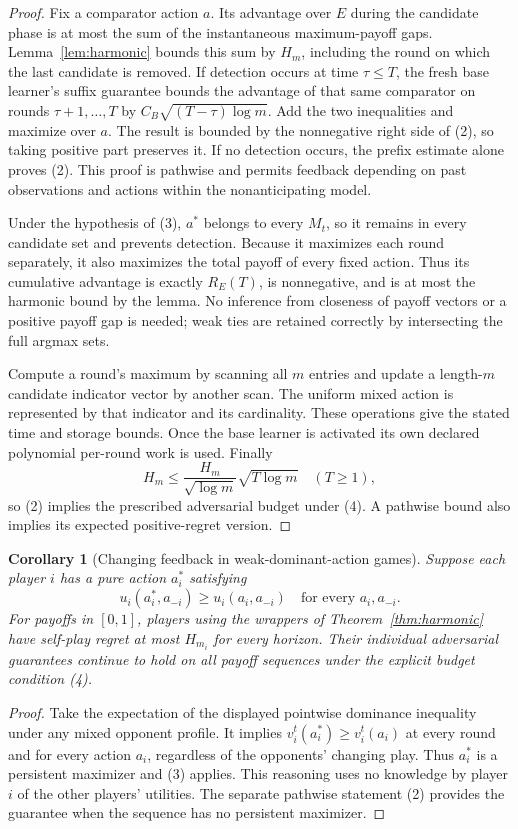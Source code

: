 \documentclass[11pt]{article}
\newtheorem{corollary}{Corollary}
\theoremstyle{definition}
\theoremstyle{remark}
\begin{document}
\begin{proof}
Fix a comparator action $a$. Its advantage over $E$ during the candidate
phase is at most the sum of the instantaneous maximum-payoff gaps.
Lemma~\ref{lem:harmonic} bounds this sum by $H_m$, including the round on
which the last candidate is removed. If detection occurs at time
$\tau\leq T$, the fresh base learner's suffix guarantee bounds the advantage
of that same comparator on rounds $\tau+1,\ldots,T$ by
$C_B\sqrt{(T-\tau)\log m}$. Add the two inequalities and maximize over
$a$. The result is bounded by the nonnegative right side of (2), so taking
positive part preserves it. If no detection occurs, the prefix estimate
alone proves (2). This proof is pathwise and permits feedback depending on
past observations and actions within the nonanticipating model.

Under the hypothesis of (3), $a^*$ belongs to every $M_t$, so it remains in
every candidate set and prevents detection. Because it maximizes each
round separately, it also maximizes the total payoff of every fixed action.
Thus its cumulative advantage is exactly $R_E(T)$, is nonnegative, and
is at most the harmonic bound by the lemma. No inference from closeness of
payoff vectors or a positive payoff gap is needed; weak ties are retained
correctly by intersecting the full argmax sets.

Compute a round's maximum by scanning all $m$ entries and update a length-$m$
candidate indicator vector by another scan. The uniform mixed action is
represented by that indicator and its cardinality. These operations give
the stated time and storage bounds. Once the base learner is activated its
own declared polynomial per-round work is used. Finally
\[
 H_m\leq \frac{H_m}{\sqrt{\log m}}\sqrt{T\log m}
 \quad(T\geq1),
\]
so (2) implies the prescribed adversarial budget under (4). A pathwise bound
also implies its expected positive-regret version.
\end{proof}

\begin{corollary}[Changing feedback in weak-dominant-action games]\label{cor:dominant}
Suppose each player $i$ has a pure action $a_i^*$ satisfying
\[
 u_i(a_i^*,a_{-i})\geq u_i(a_i,a_{-i})
 \quad\text{for every }a_i,a_{-i}.
\]
For payoffs in $[0,1]$, players using the wrappers of
Theorem~\ref{thm:harmonic} have self-play regret at most $H_{m_i}$ for every
horizon. Their individual adversarial guarantees continue to hold on all
payoff sequences under the explicit budget condition (4).
\end{corollary}
\begin{proof}
Take the expectation of the displayed pointwise dominance inequality under
any mixed opponent profile. It implies
$v_i^t(a_i^*)\geq v_i^t(a_i)$ at every round and for every action $a_i$,
regardless of the opponents' changing play. Thus $a_i^*$ is a persistent
maximizer and (3) applies. This reasoning uses no knowledge by player $i$
of the other players' utilities. The separate pathwise statement (2)
provides the guarantee when the sequence has no persistent maximizer.
\end{proof}
\end{document}
